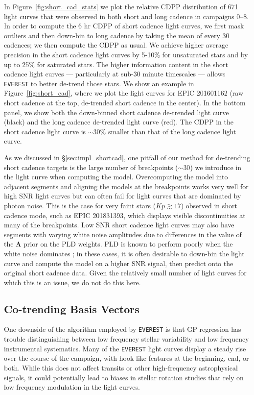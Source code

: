 \documentclass[]{aastex62}
\newcommand{\Kp}{\ensuremath{Kp}}
\newcommand{\edited}[1]{{\color{red} #1}}
\begin{document}
In Figure~\ref{fig:short_cad_stats} we plot the relative CDPP distribution of
671 light curves that were observed in both short and long cadence \edited{in campaigns 0--8}. In order to
compute the 6 hr CDPP of short cadence light curves, we first mask outliers and then
down-bin to long cadence by taking the mean of every 30 cadences; we then compute
the CDPP as usual. We achieve higher average precision in the short cadence light
curves by 5-10\% for unsaturated stars and by up to 25\% for saturated stars. The
higher information content in the short cadence light curves --- particularly
at sub-30 minute timescales --- allows \texttt{EVEREST} to better de-trend those stars.
We show an example in Figure~\ref{fig:short_cad}, where we plot the light curves
for EPIC 201601162 (raw short cadence at the top, de-trended short cadence in the
center). In the bottom panel, we show both the down-binned short cadence de-trended light
curve (black) and the long cadence de-trended light curve (red). The CDPP in the short
cadence light curve is ${\sim}30\%$ smaller than that of the long cadence light curve.

As we discussed in \S\ref{sec:impl_shortcad}, one pitfall of our method for de-trending
short cadence targets is the large number of breakpoints (${\sim}30$) we introduce
in the light curve when computing the model. Overcomputing the model into adjacent
segments and aligning the models at the breakpoints works very well for high
SNR light curves but can often fail for light curves that are dominated by photon
noise. This is the case for very faint stars ($\Kp \gtrsim 17$) observed in
short cadence mode, such as EPIC 201831393, which displays visible discontinuities
at many of the breakpoints. Low SNR short cadence light curves may also have segments
with varying white noise amplitudes due to differences in the value of the $\mathbf{\Lambda}$
prior on the PLD weights. PLD is known to perform poorly when the white noise dominates
\citep{Deming15}; in these cases, it is often desirable to down-bin the light curve and
compute the model on a higher SNR signal, then predict onto the original short cadence
data. Given the relatively small number of light curves for which this is an issue,
we do not do this here.

\subsection{Co-trending Basis Vectors}
\label{sec:cbvs}
One downside of the algorithm employed by \texttt{EVEREST} is that GP regression has trouble
distinguishing between low frequency stellar variability and low frequency instrumental
systematics. Many of the \texttt{EVEREST} light curves display a steady rise over the
course of the campaign, with hook-like features at the beginning, end, or both. While this
does not affect transits or other high-frequency astrophysical signals, it could potentially
lead to biases in stellar rotation studies that rely on low frequency modulation in the
light curves.
\end{document}
